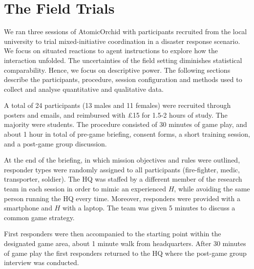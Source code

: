 \section{The Field Trials}\label{sec:evaluation}
\noindent We ran three sessions of AtomicOrchid with participants recruited from the local university to trial mixed-initiative coordination in a disaster response scenario. We focus on situated reactions to agent instructions to explore how the interaction unfolded. The uncertainties of the field setting diminishes statistical comparability. Hence, we focus on descriptive power. The following sections describe the participants, procedure, session configuration and methods used to collect and analyse quantitative and qualitative data.

A total of 24 participants (13 males and 11 females) were recruited through posters and emails, and reimbursed with \pounds 15  for 1.5-2 hours of study. The majority were students. The procedure consisted of 30 minutes of game play, and about 1 hour in total of pre-game briefing, consent forms,  a short training session, and a post-game group discussion. 


At the end of the briefing, in which mission objectives and rules were outlined, responder types were randomly assigned to all participants (fire-fighter, medic, transporter, soldier). The HQ was staffed by a different member of the research team in each session in order to mimic an experienced $H$, while avoiding the same person running the HQ every time.  Moreover, responders were provided with a smartphone and $H$ with a laptop. The team was given 5 minutes to discuss a common game strategy. 


First responders were then accompanied to the starting point within the designated game area, about 1 minute walk from headquarters. After 30 minutes of game play the first responders returned to the HQ where the post-game group interview was conducted.

